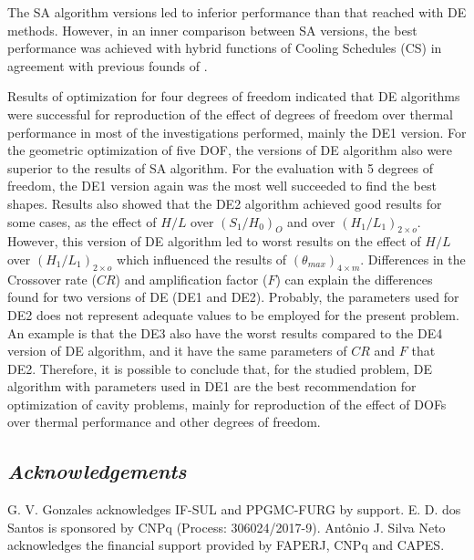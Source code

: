 \documentclass[12pt,fleqn]{article}
\begin{document}
The SA algorithm versions led to inferior performance than that reached with DE methods. However, in an inner comparison between SA versions, the best performance was achieved with hybrid functions of Cooling Schedules (CS) in agreement with previous founds of \cite{Gonzales2015a,Gonzales2015b}.

Results of optimization for four degrees of freedom indicated that DE algorithms were successful for reproduction of the effect of degrees of freedom over thermal performance in most of the investigations performed, mainly the DE1 version. For the geometric optimization of five DOF, the versions of DE algorithm also were superior to the results of SA algorithm. For the evaluation with 5 degrees of freedom, the DE1 version again was the most well succeeded to find the best shapes. Results also showed that the DE2 algorithm achieved good results for some cases, as the effect of $H/L$ over ${(S_{1}/H_{0})_{O}}$ and over ${(H_{1}/L_{1})_{2  \times o}}$. However, this version of DE algorithm led to worst results on the effect of $H/L$ over ${(H_{1}/L_{1})_{2  \times o}}$ which influenced the results of $({\theta}_{max})_{4\times m}$. Differences in the Crossover rate ($CR$) and amplification factor ($F$) can explain the differences found for two versions of DE (DE1 and DE2). Probably, the parameters used for DE2 does not represent adequate values to be employed for the present problem. An example is that the DE3 also have the worst results compared to the DE4 version of DE algorithm, and it have the same parameters of $CR$ and $F$ that DE2. Therefore, it is possible to conclude that, for the studied problem, DE algorithm with parameters used in DE1 are the best recommendation for optimization of cavity problems, mainly for reproduction of the effect of DOFs over thermal performance and other degrees of freedom.




\subsection*{\textit{Acknowledgements}}
G. V. Gonzales acknowledges IF-SUL and PPGMC-FURG by support. E. D. dos Santos is sponsored by CNPq (Process: 306024/2017-9). Antônio J. Silva Neto acknowledges the financial support provided by FAPERJ, CNPq and CAPES.



\fontsize{11}{0}\selectfont







\end{document}
